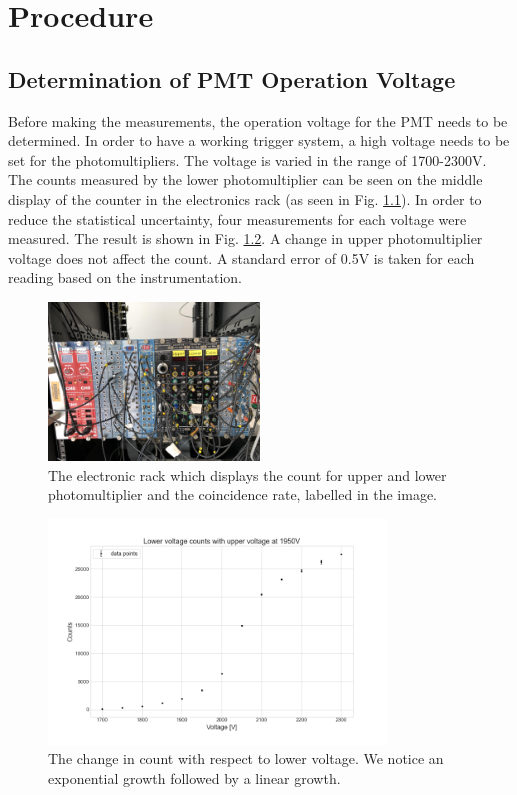 \documentclass[a4paper]{report}
\numberwithin{equation}{section}
\begin{document}
\chapter{Procedure} \label{chap:procedure}

\section{Determination of PMT Operation Voltage}
Before making the measurements, the operation voltage for the PMT needs to be determined. In order to have a working trigger system, a high voltage needs to be set for the photomultipliers. The voltage is varied in the range of 1700-2300V. The counts measured by the lower photomultiplier can be seen on the middle display of the counter in the electronics rack (as seen in Fig. \ref{fig:rack}). In order to reduce the statistical uncertainty, four measurements for each voltage were measured. The result is shown in Fig. \ref{fig:low_count}. A change in upper photomultiplier voltage does not affect the count. A standard error of 0.5V is taken for each reading based on the instrumentation. 

\begin{figure}[htpb]
    \centering
    \includegraphics[width=0.5\textwidth]{rack.jpg}
    \caption{The electronic rack which displays the count for upper and lower photomultiplier and the coincidence rate, labelled in the image.}
    \label{fig:rack}
\end{figure}	

\begin{figure}[htpb]
    \centering
    \includegraphics[width=0.8\textwidth]{low_count}
    \caption{The change in count with respect to lower voltage. We notice an exponential growth followed by a linear growth.}
    \label{fig:low_count}
\end{figure}	
\end{document}
